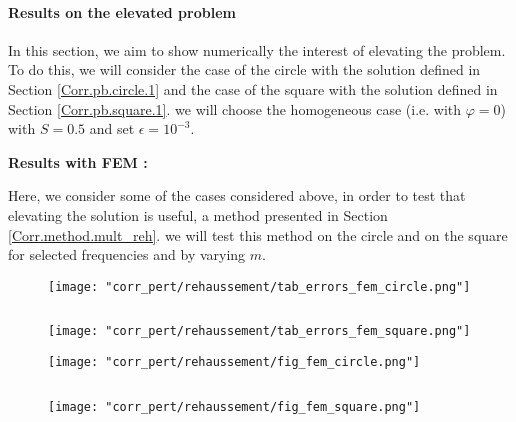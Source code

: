 \paragraph{Results on the elevated problem} \label{Corr.results.disturbed.reh} 

In this section, we aim to show numerically the interest of elevating the problem. To do this, we will consider the case of the circle with the solution defined in Section \ref{Corr.pb.circle.1} and the case of the square with the solution defined in Section \ref{Corr.pb.square.1}. we will choose the homogeneous case (i.e. with $\varphi=0$) with $S=0.5$ and set $\epsilon=10^{-3}$.

\textbf{Results with FEM :}

	Here, we consider some of the cases considered above, in order to test that elevating the solution is useful, a method presented in Section \ref{Corr.method.mult_reh}. we will test this method on the circle and on the square for selected frequencies and by varying $m$.

	\begin{minipage}{0.48\linewidth}
		\begin{figure}[H]
			\centering
			\texttt{[image: "corr\_pert/rehaussement/tab\_errors\_fem\_circle.png"]}
			\label{corr_pert_fem_circle_reh}
		\end{figure} 
	\end{minipage} $\qquad$
	\begin{minipage}{0.48\linewidth}
		\begin{figure}[H]
			\centering
			\texttt{[image: "corr\_pert/rehaussement/tab\_errors\_fem\_square.png"]}
			\label{corr_pert_fem_square_reh}
		\end{figure} 
	\end{minipage}
	
	\begin{minipage}{0.48\linewidth}
		\begin{figure}[H]
			\centering
			\texttt{[image: "corr\_pert/rehaussement/fig\_fem\_circle.png"]}
			\label{corr_pert_fem_circle_reh_fig}
		\end{figure} 
	\end{minipage} $\qquad$
	\begin{minipage}{0.48\linewidth}
		\begin{figure}[H]
			\centering
			\texttt{[image: "corr\_pert/rehaussement/fig\_fem\_square.png"]}
			\label{corr_pert_fem_square_reh_fig}
		\end{figure} 
	\end{minipage}
	 
